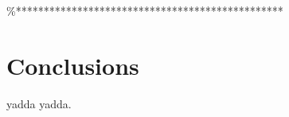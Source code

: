 \%************************************************
\chapter{Conclusions}
\label{ch_conclusions}
\acresetall

yadda yadda.
